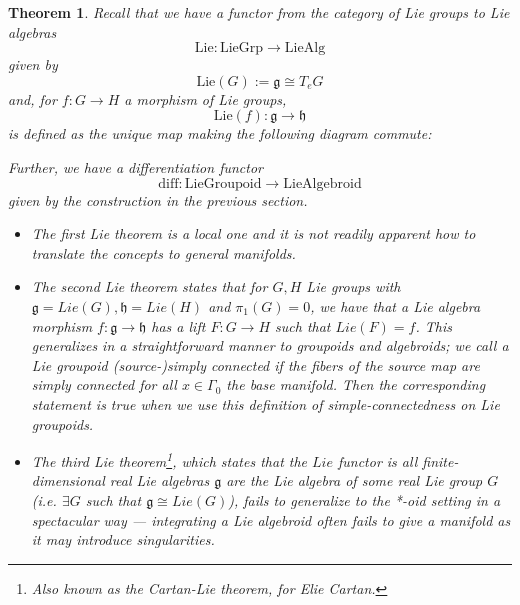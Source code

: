 \documentclass{tufte-handout}
\newtheorem{thrm}{Theorem}
\begin{document}
\begin{thrm}

Recall that we have a functor from the category of Lie groups to Lie algebras
$$
\mathrm{Lie}: \mathrm{LieGrp} \to \mathrm{LieAlg}
$$
given by
$$
\mathrm{Lie}(G) := \mathfrak{g} \cong T_e G
$$
and, for $f: G \to H$ a morphism of Lie groups,
$$
\mathrm{Lie}(f): \mathfrak{g} \to \mathfrak{h}
$$
is defined as the unique map making the following diagram commute:


Further, we have a \emph{differentiation} functor
$$
\mathrm{diff}: \mathrm{LieGroupoid} \to \mathrm{LieAlgebroid}
$$
given by the construction in the previous section.


\begin{itemize}
\item The first Lie theorem is a local one and it is not readily apparent how to translate the concepts to general manifolds.

\item The second Lie theorem states that for $G,H$ Lie groups with $\mathfrak{g} = Lie(G), \mathfrak{h} = Lie(H)$ and $\pi_1(G) = 0$, we have that a Lie algebra morphism $f: \mathfrak{g} \to \mathfrak{h}$ has a lift $F: G \to H$ such that $Lie(F) = f$. This generalizes in a straightforward manner to groupoids and algebroids; we call a Lie groupoid \emph{(source-)simply connected} if the fibers of the source map are simply connected for all $x \in \Gamma_0$ the base manifold. Then the corresponding statement is true when we use this definition of simple-connectedness on Lie groupoids.

\item The third Lie theorem\footnote{Also known as the \emph{Cartan-Lie} theorem, for Elie Cartan.}, which states that the $Lie$ functor is all finite-dimensional real Lie algebras $\mathfrak{g}$ are the Lie algebra of some real Lie group $G$ (i.e. $\exists G$ such that $\mathfrak{g} \cong Lie(G)$), fails to generalize to the *-oid setting in a spectacular way --- integrating a Lie algebroid often fails to give a manifold as it may introduce singularities. %

\end{itemize}
\end{thrm}
\end{document}
